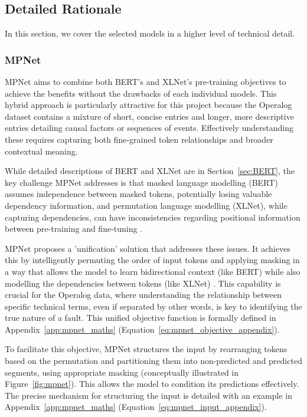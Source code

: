\documentclass[10pt,oneside]{report}
\begin{document}
\subsection{Detailed Rationale}
In this section, we cover the selected models in a higher level of technical detail.

\subsubsection{MPNet}\label{sec:rationalempnet}

MPNet aims to combine both BERT's and XLNet's pre-training objectives to achieve the benefits without the drawbacks of each individual models. This hybrid approach is particularly attractive for this project because the Operalog dataset contains a mixture of short, concise entries and longer, more descriptive entries detailing causal factors or sequences of events. Effectively understanding these requires capturing both fine-grained token relationships and broader contextual meaning.

While detailed descriptions of BERT and XLNet are in Section~\ref{sec:BERT}, the key challenge MPNet addresses is that masked language modelling (BERT) assumes independence between masked tokens, potentially losing valuable dependency information, and permutation language modelling (XLNet), while capturing dependencies, can have inconsistencies regarding positional information between pre-training and fine-tuning \cite{song2020mpnet, yang2019xlnet}.

MPNet proposes a 'unification' solution that addresses these issues. It achieves this by intelligently permuting the order of input tokens and applying masking in a way that allows the model to learn bidirectional context (like BERT) while also modelling the dependencies between tokens (like XLNet) \cite{song2020mpnet}.
This capability is crucial for the Operalog data, where understanding the relationship between specific technical terms, even if separated by other words, is key to identifying the true nature of a fault.
This unified objective function is formally defined in Appendix~\ref{app:mpnet_maths} (Equation~\ref{eq:mpnet_objective_appendix}).

To facilitate this objective, MPNet structures the input by rearranging tokens based on the permutation and partitioning them into non-predicted and predicted segments, using appropriate masking (conceptually illustrated in Figure~\ref{fig:mpnet}). This allows the model to condition its predictions effectively. The precise mechanism for structuring the input is detailed with an example in Appendix~\ref{app:mpnet_maths} (Equation~\ref{eq:mpnet_input_appendix}).
\end{document}
